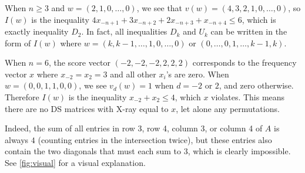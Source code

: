 \documentclass[letterpaper,reqno,11pt]{amsart}
\begin{document}
\begin{example}\label{ex:fund_weights}
    When $n\geq 3$ and $w = (2, 1, 0, \dots, 0)$, we see that $v(w) = (4, 3, 2, 1, 0, \dots, 0)$, so $I(w)$ is the inequality $4x_{-n+1}+3x_{-n+2}+2x_{-n+3}+x_{-n+4}\leq 6$, which is exactly inequality $D_2$. In fact, all inequalities $D_k$ and $U_k$ can be written in the form of $I(w)$ where $w = (k, k-1, \dots, 1, 0, \dots, 0)$ or $(0, \dots, 0, 1, \dots, k-1, k)$.
\end{example}

\begin{example}\label{ex:counter_example}
    When $n = 6$, the score vector $(-2, -2, -2, 2, 2, 2)$ corresponds to the frequency vector $x$ where $x_{-2} = x_2 = 3$ and all other $x_i$'s are zero. When $w = (0, 0, 1, 1, 0, 0)$, we see $v_d(w) = 1$ when $d = -2$ or $2$, and zero otherwise. Therefore $I(w)$ is the inequality $x_{-2} + x_{2} \leq 4$, which $x$ violates. This means there are no DS matrices with X-ray equal to $x$, let alone any permutations.

    Indeed, the sum of all entries in row 3, row 4, column 3, or column 4 of $A$ is always $4$ (counting entries in the intersection twice), but these entries also contain the two diagonals that must each sum to $3$, which is clearly impossible. See \cref{fig:visual} for a visual explanation.
\end{example}
\end{document}
